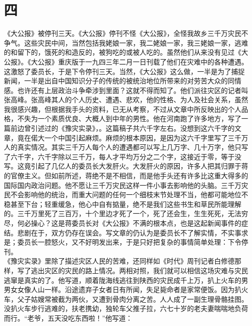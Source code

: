 \fancyhead[RO]{\thepage} %
\fancyhead[LE]{\thepage} %
\fancyfoot[LE,RO]{}
\fancyfoot[LO,CE]{}
\fancyfoot[CO,RE]{}
\chapter*{四}
《大公报》被停刊三天。《大公报》停刊不怪《大公报》，全怪我故乡三千万灾民不争气。这些灾民中间，当然包括我姥娘一家，我二姥娘一家，我三姥娘一家，逃难的和留下的，饿死的和造反的，被狗吃的或被人吃的。虽然他们从来没有见过《大公报》。《大公报》重庆版于一九四三年二月一日刊载了他们在灾难中的各种遭遇。这激怒了委员长，于是下令停刊三天。当然，《大公报》这么做，一半是为了捕捉新闻，一半是出自中国知识分子的传统的被统治地位所带来的对劳苦大众的同情感。也许还有上层政治斗争牵涉到里面？这就不得而知了。他们派往灾区的记者叫张高峰。张高峰其人的个人历史、遭遇、悲欢，他的性格、为人及社会关系，虽然我很感兴趣，但根据我手头的资料，已无从考察，不过从文章中所反映出的个人品格，不失为一个素质优良、大概人到中年的男性。他在河南跑了许多地方，写了一篇前边曾引述过的《豫灾实录》，。这篇稿子共六千字左右。没想到这六千字的文章，竟在偌大一个中国引起麻烦。麻烦的根本原因，是因为这六千字里写了三千万人的真实情况。其实三千万人每个人的遭遇都可以写上几万字、几十万字，他只写了六千字，六千字除以三千万，每人才平均万分之二个字，这接近于零，等于没写。这竟引起了几亿人的委员长大发肝火。大发肝火的原因，许多人把其归罪于蒋的官僚主义。但如前所述，蒋绝不是不相信，而是他手头还有许多比这重大得多的国际国内政治问题。他不愿让三千万灾民这样一件小事去影响他的头脑。三千万灾民不会影响他的统治，而重大问题的任何一个细枝末节处理不当，他都可能地位不稳甚至下台；轻重缓急，他心中自有掂量，绝不是我们这些书生和草民所能理解的。三千万里死了三百万，十个里边才死了一个，死了还会生，生生死死，无法穷尽，何必操心？这是蒋委员长对《大公报》不满的根本点，也是这起新闻事件的症结。悲剧在于，双方仍存在误会。写文章的仍认为是委员长不了解实情，不实事求是；委员长一腔怒火，又不好明发出来，于是只好把复杂的事情简单处理：下令停刊。\\

《豫灾实录》里除了描述灾区人民的苦难，还同样如《时代》周刊记者白修德那样，写了逃出灾区的灾民的路上情况。两相对照，我们就可以相信这场灾难与灾民逃窜是真实的了。他写道，顺着陇海线逃往到陕西的灾民成千上万，扒上火车的男男女女像人山一样。沿途遗弃子女者日有所闻，失足毙命者是家常便饭。因为扒火车，父子姑嫂常被截为两伙，又遭到骨肉分离之苦。人人成了一副生理骨骼挂图。没扒火车步行逃难的，扶老携幼，独轮车父推子拉，六七十岁的老夫妻喘喘地负荷而行。“老爷，五天没吃东西啦！”他写道：\\

